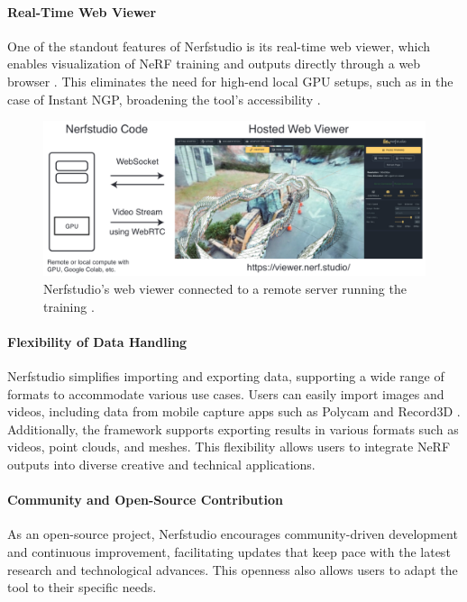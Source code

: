 \paragraph{Real-Time Web Viewer}
One of the standout features of Nerfstudio is its real-time web viewer, which enables visualization of NeRF training and outputs directly through a web browser .
This eliminates the need for high-end local GPU setups, such as in the case of Instant NGP, broadening the tool's accessibility \cite{noauthor_nerfstudio-projectviser_2024}.

\begin{figure}[h!]
  \centering
  \includegraphics[width=\textwidth]{figures/related-nerfstudio-viewer.png}
  \caption{Nerfstudio's web viewer connected to a remote server running the training \cite{tancik_nerfstudio_2023}.}
  \label{fig:nerfstudio-viewer}
\end{figure}

\paragraph{Flexibility of Data Handling}
Nerfstudio simplifies importing and exporting data, supporting a wide range of formats to accommodate various use cases.
Users can easily import images and videos, including data from mobile capture apps such as Polycam \cite{noauthor_polycam_nodate} and Record3D \cite{noauthor_record3d_nodate}.
Additionally, the framework supports exporting results in various formats such as videos, point clouds, and meshes.
This flexibility allows users to integrate NeRF outputs into diverse creative and technical applications.

\paragraph{Community and Open-Source Contribution}
As an open-source project, Nerfstudio encourages community-driven development and continuous improvement, facilitating updates that keep pace with the latest research and technological advances.
This openness also allows users to adapt the tool to their specific needs.

